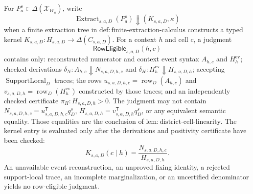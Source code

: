 For \(P_a^s\in\Delta(\mathcal X_{W_a})\), write
\[
\operatorname{Extract}_{s,a,D}(P_a^s)\Downarrow(K_{s,a,D},\kappa)
\]
when a finite extraction tree in \(\mathrm{def:finite\text{-}extraction\text{-}calculus}\) constructs a typed kernel \(K_{s,a,D}:H_{s,a,D}\to\Delta(C_{s,a,D})\).  For a context \(h\) and cell \(c\), a judgment
\[
\mathsf{RowEligible}_{s,a,D}(h,c)
\]
contains only: reconstructed numerator and context event syntax \(A_{h,c}\) and \(H_h^{\mathrm{ev}}\); checked derivations \(\delta_N:A_{h,c}\Downarrow N_{s,a,D,h,c}\) and \(\delta_H:H_h^{\mathrm{ev}}\Downarrow H_{s,a,D,h}\); accepting \(\operatorname{SupportLocal}_D\) traces; the rows \(u_{s,a,D,h,c}=\operatorname{row}_D(A_{h,c})\) and \(v_{s,a,D,h}=\operatorname{row}_D(H_h^{\mathrm{ev}})\) constructed by those traces; and an independently checked certificate \(\pi_H:H_{s,a,D,h}>0\).  The judgment may not contain \(N_{s,a,D,h,c}=u_{s,a,D,h,c}^{\mathsf T}q_D^s\), \(H_{s,a,D,h}=v_{s,a,D,h}^{\mathsf T}q_D^s\), or any equivalent semantic equality.  Those equalities are the conclusion of \(\mathrm{lem:district\text{-}cell\text{-}linearity}\).  The kernel entry is evaluated only after the derivations and positivity certificate have been checked:
\[
K_{s,a,D}(c\mid h)=\frac{N_{s,a,D,h,c}}{H_{s,a,D,h}}.
\]
An unavailable event reconstruction, an unproved fixing identity, a rejected support-local trace, an incomplete marginalization, or an uncertified denominator yields no row-eligible judgment.